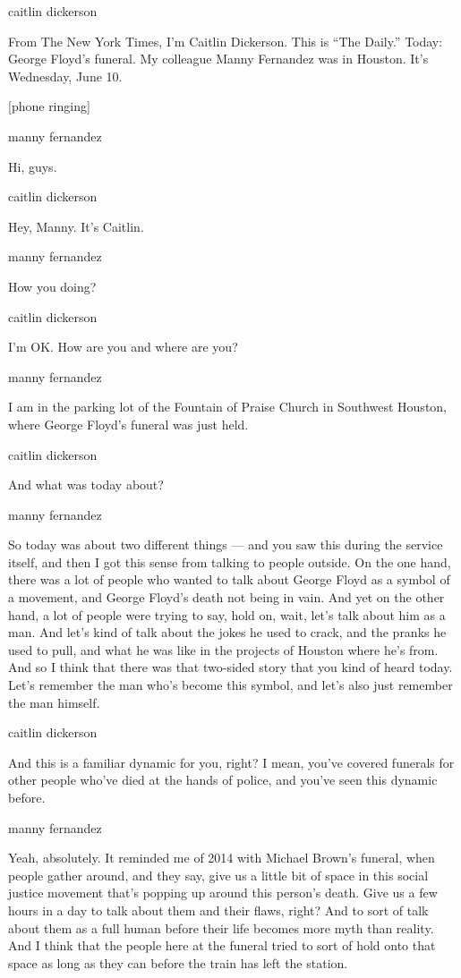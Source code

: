 caitlin dickerson

From The New York Times, I'm Caitlin Dickerson. This is ``The Daily.''
Today: George Floyd's funeral. My colleague Manny Fernandez was in
Houston. It's Wednesday, June 10.

{[}phone ringing{]}

manny fernandez

Hi, guys.

caitlin dickerson

Hey, Manny. It's Caitlin.

manny fernandez

How you doing?

caitlin dickerson

I'm OK. How are you and where are you?

manny fernandez

I am in the parking lot of the Fountain of Praise Church in Southwest
Houston, where George Floyd's funeral was just held.

caitlin dickerson

And what was today about?

manny fernandez

So today was about two different things --- and you saw this during the
service itself, and then I got this sense from talking to people
outside. On the one hand, there was a lot of people who wanted to talk
about George Floyd as a symbol of a movement, and George Floyd's death
not being in vain. And yet on the other hand, a lot of people were
trying to say, hold on, wait, let's talk about him as a man. And let's
kind of talk about the jokes he used to crack, and the pranks he used to
pull, and what he was like in the projects of Houston where he's from.
And so I think that there was that two-sided story that you kind of
heard today. Let's remember the man who's become this symbol, and let's
also just remember the man himself.

caitlin dickerson

And this is a familiar dynamic for you, right? I mean, you've covered
funerals for other people who've died at the hands of police, and you've
seen this dynamic before.

manny fernandez

Yeah, absolutely. It reminded me of 2014 with Michael Brown's funeral,
when people gather around, and they say, give us a little bit of space
in this social justice movement that's popping up around this person's
death. Give us a few hours in a day to talk about them and their flaws,
right? And to sort of talk about them as a full human before their life
becomes more myth than reality. And I think that the people here at the
funeral tried to sort of hold onto that space as long as they can before
the train has left the station.

